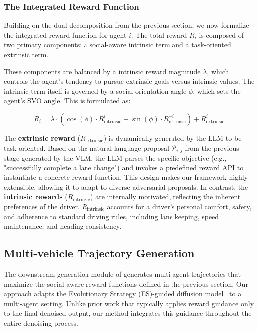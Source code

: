 \subsubsection{The Integrated Reward Function} 

Building on the dual decomposition from the previous section, we now formalize the integrated reward function for agent $i$. The total reward $R_i$ is composed of two primary components: a social-aware intrinsic term and a task-oriented extrinsic term.

These components are balanced by a intrinsic reward magnitude $\lambda$, which controls the agent's tendency to pursue extrinsic goals versus intrinsic values. The intrinsic term itself is governed by a social orientation angle $\phi$, which sets the agent's SVO angle. This is formulated as:

\begin{equation} \label{eq:social_reward}
R_i = \lambda \cdot ( \cos(\phi) \cdot R^{i}_{\text{intrinsic}} + \sin(\phi) \cdot R^{-i}_{\text{intrinsic}}) + R^{i}_{\text{extrinsic}}
\end{equation}

The \textbf{extrinsic reward} ($R_{\text{extrinsic}}$) is dynamically generated by the LLM to be task-oriented. Based on the natural language proposal $\mathcal{P}_{i,j}$ from the previous stage generated by the VLM, the LLM parses the specific objective (e.g., "successfully complete a lane change") and invokes a predefined reward API to instantiate a concrete reward function. This design makes our framework highly extensible, allowing it to adapt to diverse adversarial proposals. In contrast, the \textbf{intrinsic rewards} ($R_{\text{intrinsic}}$) are internally motivated, reflecting the inherent preferences of the driver. $R_{\text{intrinsic}}$ accounts for a driver's personal comfort, safety, and adherence to standard driving rules, including lane keeping, speed maintenance, and heading consistency.

\subsection{Multi-vehicle Trajectory Generation} 

The downstream generation module of \our generates multi-agent trajectories that maximize the social-aware reward functions defined in the previous section. Our approach adapts the Evolutionary Strategy (ES)-guided diffusion model~\citep{yang2024diffusion} to a multi-agent setting. Unlike prior work that typically applies reward guidance only to the final denoised output, our method integrates this guidance throughout the entire denoising process. 


